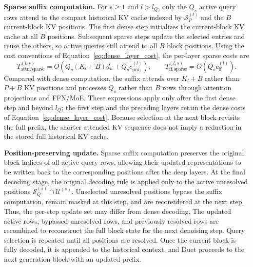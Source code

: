 
\textbf{Sparse suffix computation.} For $s\geq1$ and $l>l_Q$, only the $Q_s$ active query rows attend to the compact historical KV cache indexed by $\mathcal{S}_P^{(l)}$ and the $B$ current-block KV positions. The first dense step initializes the current-block KV cache at all $B$
positions. Subsequent sparse steps update the selected entries and reuse
the others, so active queries still attend to all $B$ block positions. Using the cost conventions of Equation~\ref{eq:dense_layer_cost}, the per-layer sparse costs are
\begin{equation}
T_{\mathrm{attn,sparse}}^{(l,s)}
=O\!\left(Q_s(K_l+B)d_h+Q_s c_{\mathrm{proj}}^{(l)}\right),
\qquad
T_{\mathrm{ff,sparse}}^{(l,s)}
=O\!\left(Q_s c_{\mathrm{ff}}^{(l)}\right).
\label{eq:sparse_layer_cost}
\end{equation}
Compared with dense computation, the suffix attends over $K_l+B$ rather than $P+B$ KV positions and processes $Q_s$ rather than $B$ rows through attention projections and FFN/MoE. These expressions apply only after the first dense step and beyond $l_Q$; the first step and the preceding layers retain the dense costs of Equation~\ref{eq:dense_layer_cost}. Because selection at the next block revisits the full prefix, the shorter attended KV sequence does not imply a reduction in the stored full historical KV cache.

\textbf{Position-preserving update.} Sparse suffix computation preserves the
original block indices of all active query rows, allowing their updated
representations to be written back to the corresponding positions after the
deep layers. At the final decoding stage, the original decoding rule is
applied only to the active unresolved positions
$\mathcal{S}_Q^{(s)}\cap\mathcal{U}^{(s)}$. Unselected unresolved positions
bypass the suffix computation, remain masked at this step, and are
reconsidered at the next step. Thus, the per-step update set may differ from
dense decoding. The updated active rows, bypassed unresolved rows, and
previously resolved rows are recombined to reconstruct the full block state
for the next denoising step. Query selection is repeated until all positions
are resolved. Once the current block is fully decoded, it is appended to the
historical context, and Duet proceeds to the next generation block with an
updated prefix.